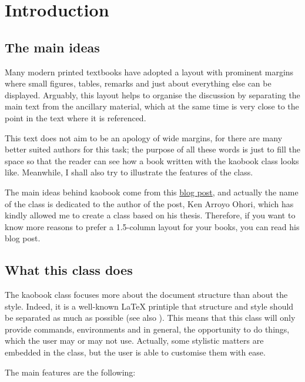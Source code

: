 \setchapterpreamble[u]{\margintoc}
\chapter{Introduction}

\section{The main ideas}

Many modern printed textbooks have adopted a layout with prominent 
margins where small figures, tables, remarks and just about everything 
else can be displayed. Arguably, this layout helps to organise the 
discussion by separating the main text from the ancillary material, 
which at the same time is very close to the point in the text where it 
is referenced.

This text does not aim to be an apology of wide margins, for there are 
many better suited authors for this task; the purpose of all these words 
is just to fill the space so that the reader can see how a book written 
with the kaobook class looks like. Meanwhile, I shall also try to 
illustrate the features of the class.

The main ideas behind kaobook come from this 
\href{https://3d.bk.tudelft.nl/ken/en/2016/04/17/a-1.5-column-layout-in-latex.html}{blog 
	post}, and actually the name of the class is dedicated to the author 
of the post, Ken Arroyo Ohori, which has kindly allowed me to create a 
class based on his thesis. Therefore, if you want to know more reasons 
to prefer a 1.5-column layout for your books, you can read his blog 
post.

\section{What this class does}

The kaobook class focuses more about the document structure than about 
the style. Indeed, it is a well-known \LaTeX\xspace printiple that 
structure and style should be separated as much as possible (see also 
). This means that this class will only provide 
commands, environments and in general, the opportunity to do things, 
which the user may or may not use. Actually, some stylistic matters are 
embedded in the class, but the user is able to customise them with ease.

The main features are the following:

